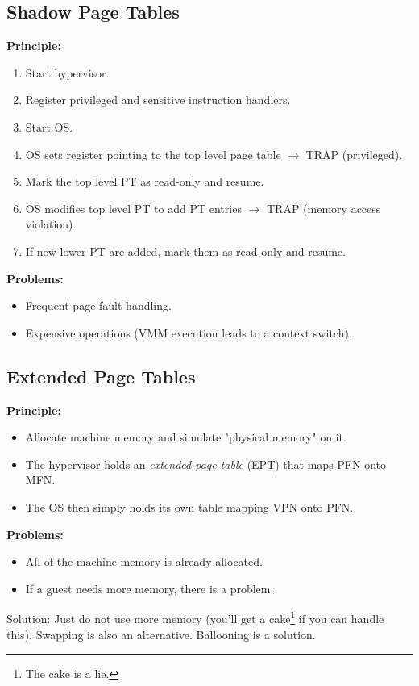 		\subsection{Shadow Page Tables}
			\textbf{Principle:}
			\begin{enumerate}
				\item Start hypervisor.
				\item Register privileged and sensitive instruction handlers.
				\item Start OS.
				\item OS sets register pointing to the top level page table \(\rightarrow\) TRAP (privileged).
				\item Mark the top level PT as read-only and resume.
				\item OS modifies top level PT to add PT entries \(\rightarrow\) TRAP (memory access violation).
				\item If new lower PT are added, mark them as read-only and resume.
			\end{enumerate}

			\textbf{Problems:}
			\begin{itemize}
				\item Frequent page fault handling.
				\item Expensive operations (VMM execution leads to a context switch).
			\end{itemize}

		\subsection{Extended Page Tables}
			\textbf{Principle:}
			\begin{itemize}
				\item Allocate machine memory and simulate "physical memory" on it.
				\item The hypervisor holds an \textit{extended page table} (EPT) that maps PFN onto MFN.
				\item The OS then simply holds its own table mapping VPN onto PFN.
			\end{itemize}

			\textbf{Problems:}
			\begin{itemize}
				\item All of the machine memory is already allocated.
				\item If a guest needs more memory, there is a problem.
			\end{itemize}

			Solution: Just do not use more memory (you'll get a cake\footnote{The cake is a lie.} if you can handle this). Swapping is also an alternative. Ballooning is a solution.

